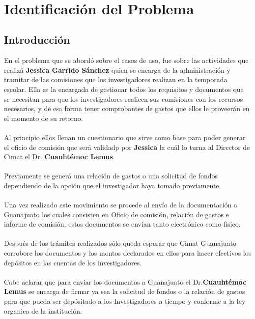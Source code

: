 \documentclass{report}
\makeatletter
\let\thedate\@date
\makeatother
\begin{document}
\begin{titlepage}
	{\large \thedate}\\[2 cm]
 
	\vfill
	
\end{titlepage}


\tableofcontents
\pagebreak

\chapter{Identificación del Problema}
    
    \section{Introducción}

En el problema que se abordó sobre el casos de uso, fue sobre las actividades que realizá \textbf{Jessica Garrido Sánchez}  quien se encarga de la administración y tramitar de las comisiones que los investigadores realizan en la temporada escolar. Ella es la encargada de gestionar todos los requisitos y documentos que se necesitan para que los investigadores realicen sus comisiones con los recursos necesarios, y de esa forma tener comprobantes de gastos que ellos le proveerán en el momento de su retorno.\\\\
Al principio ellos llenan un cuestionario que sirve como base para poder generar el oficio de comisión que será validadp por \textbf{Jessica} la cuál lo turna al Director de Cimat el Dr. \textbf{Cuauhtémoc Lemus}.\\\\
Previamente se generá una relación de gastos o una solicitud de fondos dependiendo de la opción que el investigador haya tomado previamente.\\\\
Una vez realizado este movimiento se procede al envío de la documentación a Guanajuato los cuales consisten en Oficio de comisión, relación de gastos e informe de comisión, estos documentos se envían tanto electrónico como físico.\\\\
Después de los trámites realizados sólo queda esperar que Cimat Guanajuato corrobore los documentos y los montos declarados en ellos para hacer efectivos los depósitos en las cuentas de los investigadores.\\\\
Cabe aclarar que para enviar los documentos a Guanajuato el Dr.\textbf{Cuauhtémoc Lemus} se encarga de firmar ya sea la solicitud de fondos o la relación de gastos para que pueda ser depósitado a los Investigadores a tiempo y conforme a la ley organica de la institución. 
\end{document}
